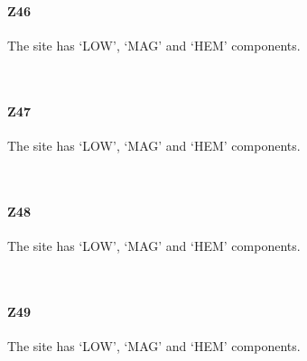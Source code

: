 \documentclass[11pt]{article}
\begin{document}
    \paragraph{Z46}\label{z46}

    The site has `LOW', `MAG' and `HEM' components.



    \begin{center}
    \end{center}
    { \hspace*{\fill} \\}
    
    \paragraph{Z47}\label{z47}

    The site has `LOW', `MAG' and `HEM' components.



    \begin{center}
    \end{center}
    { \hspace*{\fill} \\}
    
    \paragraph{Z48}\label{z48}

    The site has `LOW', `MAG' and `HEM' components.



    \begin{center}
    \end{center}
    { \hspace*{\fill} \\}
    
    \paragraph{Z49}\label{z49}

    The site has `LOW', `MAG' and `HEM' components.
\end{document}
